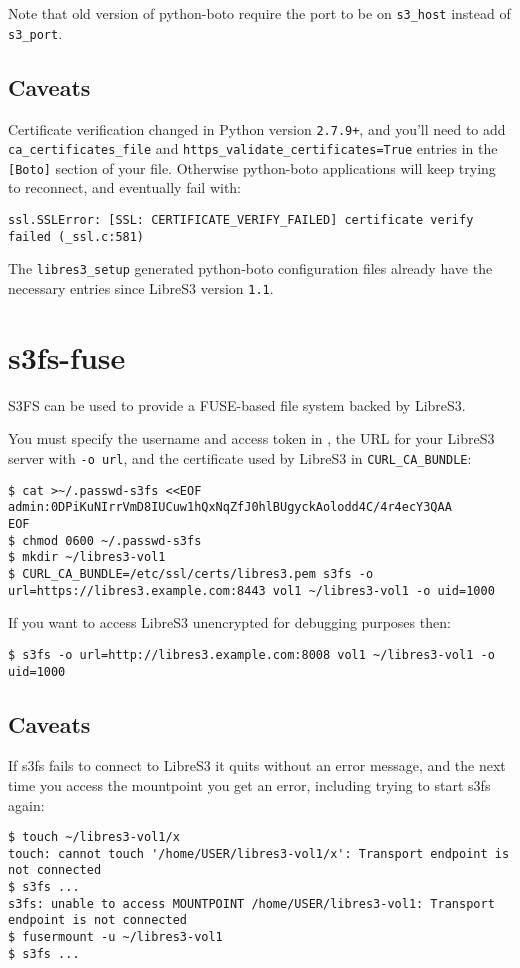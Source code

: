 Note that old version of python-boto require the port to be on \verb|s3_host|
instead of \verb|s3_port|.

\subsection{Caveats}

Certificate verification changed in Python version \verb|2.7.9+|, and you'll need
to add \verb|ca_certificates_file| and \verb|https_validate_certificates=True| entries in the \verb|[Boto]| section of
your  file.
Otherwise python-boto applications will keep trying to reconnect, and eventually
fail with:
\begin{lstlisting}
ssl.SSLError: [SSL: CERTIFICATE_VERIFY_FAILED] certificate verify failed (_ssl.c:581)
\end{lstlisting}

The \verb|libres3_setup| generated python-boto configuration files already have
the necessary entries since LibreS3 version \verb|1.1|.

\section{s3fs-fuse}

S3FS can be used to provide a FUSE-based file system backed by LibreS3.

You must specify the \SX username and access token in ,
the URL for your LibreS3 server with \verb|-o url|, and the certificate
used by LibreS3 in \verb|CURL_CA_BUNDLE|:
\begin{lstlisting}
$ cat >~/.passwd-s3fs <<EOF
admin:0DPiKuNIrrVmD8IUCuw1hQxNqZfJ0hlBUgyckAolodd4C/4r4ecY3QAA
EOF
$ chmod 0600 ~/.passwd-s3fs
$ mkdir ~/libres3-vol1
$ CURL_CA_BUNDLE=/etc/ssl/certs/libres3.pem s3fs -o url=https://libres3.example.com:8443 vol1 ~/libres3-vol1 -o uid=1000
\end{lstlisting}

If you want to access LibreS3 unencrypted for debugging purposes then:
\begin{lstlisting}
$ s3fs -o url=http://libres3.example.com:8008 vol1 ~/libres3-vol1 -o uid=1000
\end{lstlisting}

\subsection{Caveats}

If s3fs fails to connect to LibreS3 it quits without an error message,
and the next time you access the mountpoint you get an error,
including trying to start s3fs again:
\begin{lstlisting}
$ touch ~/libres3-vol1/x
touch: cannot touch '/home/USER/libres3-vol1/x': Transport endpoint is not connected
$ s3fs ...
s3fs: unable to access MOUNTPOINT /home/USER/libres3-vol1: Transport endpoint is not connected
$ fusermount -u ~/libres3-vol1
$ s3fs ...
\end{lstlisting}

